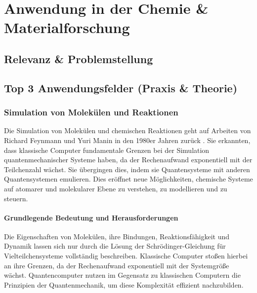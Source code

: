 \chapter{Anwendung in der Chemie \& Materialforschung}
\label{trends} %



\section{Relevanz \& Problemstellung}
\section{Top 3 Anwendungsfelder (Praxis \& Theorie)}
\subsection{Simulation von Molekülen und Reaktionen}

Die Simulation von Molekülen und chemischen Reaktionen geht auf Arbeiten von Richard Feynmann und Yuri Manin in den 1980er Jahren zurück \cite{cao_quantum_2019}. Sie erkannten, dass klassische Computer fundamentale Grenzen bei der Simulation quantenmechanischer Systeme haben, da der Rechenaufwand exponentiell mit der Teilchenzahl wächst. Sie übergingen dies, indem sie Quantensysteme mit anderen Quantensystemen emulieren.  Dies eröffnet neue Möglichkeiten, chemische Systeme auf atomarer und molekularer Ebene zu verstehen, zu modellieren und zu steuern.
\subsubsection{Grundlegende Bedeutung und Herausforderungen}
Die Eigenschaften von Molekülen, ihre Bindungen, Reaktionsfähigkeit und Dynamik lassen sich nur durch die Lösung der Schrödinger-Gleichung für Vielteilchensysteme vollständig beschreiben. Klassische Computer stoßen hierbei an ihre Grenzen, da der Rechenaufwand exponentiell mit der Systemgröße wächst. Quantencomputer nutzen im Gegensatz zu klassischen Computern die Prinzipien der Quantenmechanik, um diese Komplexität effizient nachzubilden.

